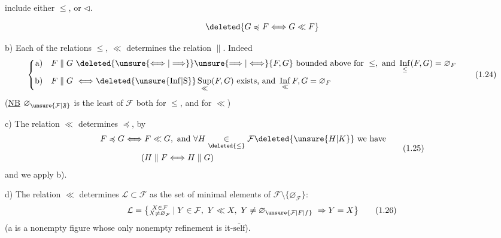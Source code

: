 include either $\leq$, or $\triangleleft$.

\[
\deleted{G\preccurlyeq F\Longleftrightarrow G\ll F}
\]

b) Each of the relations $\leq$, $\ll$ determines the relation $\parallel$. Indeed
\[
\left\{\begin{aligned}
\text{a)}\quad F\parallel G &\ \deleted{\unsure{\Longleftrightarrow|\Longrightarrow}}\unsure{\Longrightarrow|\Longleftrightarrow}
 \{F,G\}\ \text{bounded above for }\leq,\ \text{and }\mathop{\mathrm{Inf}}\limits_{\leq}(F,G)=\varnothing_F\\
\text{b)}\quad F\parallel G &\ \Longleftrightarrow
 \deleted{\unsure{\mathrm{Inf}|\mathrm{S}}}\mathop{\mathrm{Sup}}\limits_{\ll}(F,G)\ \text{exists, and }\mathop{\mathrm{Inf}}\limits_{\ll} F,G=\varnothing_F
\end{aligned}\right.
\tag*{(1.24)}
\]
(\uline{NB} $\varnothing_{\unsure{\mathcal{F}|\mathfrak{F}}}$ is the least  of $\mathcal{F}$ both for $\leq$, and for $\ll$)

c) The relation $\ll$ determines $\preccurlyeq$, by
\margin{$\times$}
\[
\begin{aligned}
F\preccurlyeq G &\Longleftrightarrow F\ll G,\ \text{and }\forall H\underset{\deleted{\leq}}{\in}\mathcal{F}\deleted{\unsure{H|K}}\ \text{we have}\\
&\hspace{2em}(H\parallel F\Longleftrightarrow H\parallel G)
\end{aligned}
\tag*{(1.25)}
\]
and we apply b).

d) The relation $\ll$ determines $\mathcal{L}\subset\mathcal{F}$ as the set of minimal elements of $\mathcal{F}\setminus\{\varnothing_{\mathcal{F}}\}$:
\[
\mathcal{L}=\bigl\{\substack{X\in\mathcal{F}\\ X\neq\varnothing_{\mathcal{F}}}\mid
 Y\in\mathcal{F},\ Y\ll X,\ Y\neq\varnothing_{\unsure{\mathcal{F}|F|f}}\ \Rightarrow Y=X\bigr\} \tag*{(1.26)}
\]
(a  is a nonempty figure whose only nonempty refinement is it-$\overline{\mathrm{self}}$).

